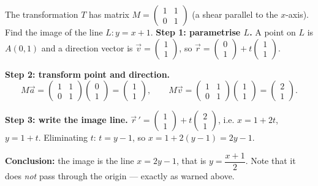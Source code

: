\documentclass[11pt]{article}
\begin{document}
\begin{exoresolu}
The transformation $T$ has matrix $M = \begin{pmatrix} 1 & 1 \\ 0 & 1 \end{pmatrix}$ (a shear parallel to the $x$-axis). Find the image of the line $L: y = x + 1$.
\tcblower
\textbf{Step 1: parametrise $L$.} A point on $L$ is $A(0,1)$ and a direction vector is $\vec{v} = \begin{pmatrix} 1 \\ 1 \end{pmatrix}$, so $\vec{r} = \begin{pmatrix} 0 \\ 1 \end{pmatrix} + t\begin{pmatrix} 1 \\ 1 \end{pmatrix}$.

\textbf{Step 2: transform point and direction.}
\[
M\vec{a} = \begin{pmatrix} 1 & 1 \\ 0 & 1 \end{pmatrix}\begin{pmatrix} 0 \\ 1 \end{pmatrix} = \begin{pmatrix} 1 \\ 1 \end{pmatrix}, \qquad
M\vec{v} = \begin{pmatrix} 1 & 1 \\ 0 & 1 \end{pmatrix}\begin{pmatrix} 1 \\ 1 \end{pmatrix} = \begin{pmatrix} 2 \\ 1 \end{pmatrix}.
\]

\textbf{Step 3: write the image line.} $\vec{r}\,' = \begin{pmatrix} 1 \\ 1 \end{pmatrix} + t\begin{pmatrix} 2 \\ 1 \end{pmatrix}$, i.e. $x = 1 + 2t$, $y = 1 + t$. Eliminating $t$: $t = y - 1$, so $x = 1 + 2(y-1) = 2y - 1$.

\textbf{Conclusion:} the image is the line $x = 2y - 1$, that is $y = \dfrac{x+1}{2}$. Note that it does \emph{not} pass through the origin — exactly as warned above.
\end{exoresolu}
\end{document}
